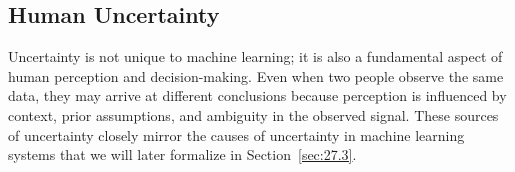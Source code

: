 \documentclass{article}
\begin{document}






\subsection{Human Uncertainty}

Uncertainty is not unique to machine learning; it is also a fundamental aspect of human perception and decision-making. Even when two people observe the same data, they may arrive at different conclusions because perception is influenced by context, prior assumptions, and ambiguity in the observed signal. These sources of uncertainty closely mirror the causes of uncertainty in machine learning systems that we will later formalize in Section~\ref{sec:27.3}.
\end{document}
